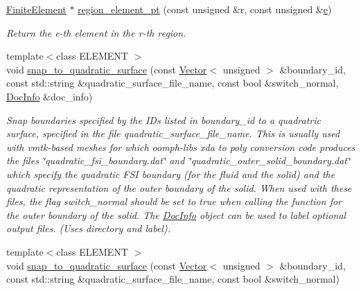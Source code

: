 \begin{DoxyCompactItemize}
\hyperlink{classoomph_1_1FiniteElement}{Finite\+Element} $\ast$ \hyperlink{classoomph_1_1TetMeshBase_aad68c706b9ff575128cc995f51d31b00}{region\+\_\+element\+\_\+pt} (const unsigned \&r, const unsigned \&\hyperlink{cfortran_8h_a37cd013acc76697829c324bdd8562d82}{e})
\begin{DoxyCompactList}\small\item\em Return the e-\/th element in the r-\/th region. \end{DoxyCompactList}\item 
{\footnotesize template$<$class E\+L\+E\+M\+E\+NT $>$ }\\void \hyperlink{classoomph_1_1TetMeshBase_a170ad79a306435b4a6ed828f6b5739ff}{snap\+\_\+to\+\_\+quadratic\+\_\+surface} (const \hyperlink{classoomph_1_1Vector}{Vector}$<$ unsigned $>$ \&boundary\+\_\+id, const std\+::string \&quadratic\+\_\+surface\+\_\+file\+\_\+name, const bool \&switch\+\_\+normal, \hyperlink{classoomph_1_1DocInfo}{Doc\+Info} \&doc\+\_\+info)
\begin{DoxyCompactList}\small\item\em Snap boundaries specified by the I\+Ds listed in boundary\+\_\+id to a quadratric surface, specified in the file quadratic\+\_\+surface\+\_\+file\+\_\+name. This is usually used with vmtk-\/based meshes for which oomph-\/lib\textquotesingle{}s xda to poly conversion code produces the files \char`\"{}quadratic\+\_\+fsi\+\_\+boundary.\+dat\char`\"{} and \char`\"{}quadratic\+\_\+outer\+\_\+solid\+\_\+boundary.\+dat\char`\"{} which specify the quadratic F\+SI boundary (for the fluid and the solid) and the quadratic representation of the outer boundary of the solid. When used with these files, the flag switch\+\_\+normal should be set to true when calling the function for the outer boundary of the solid. The \hyperlink{classoomph_1_1DocInfo}{Doc\+Info} object can be used to label optional output files. (Uses directory and label). \end{DoxyCompactList}\item 
{\footnotesize template$<$class E\+L\+E\+M\+E\+NT $>$ }\\void \hyperlink{classoomph_1_1TetMeshBase_ac067df5d8df1ab20ab6ab26ab0c52399}{snap\+\_\+to\+\_\+quadratic\+\_\+surface} (const \hyperlink{classoomph_1_1Vector}{Vector}$<$ unsigned $>$ \&boundary\+\_\+id, const std\+::string \&quadratic\+\_\+surface\+\_\+file\+\_\+name, const bool \&switch\+\_\+normal)

\end{DoxyCompactItemize}
